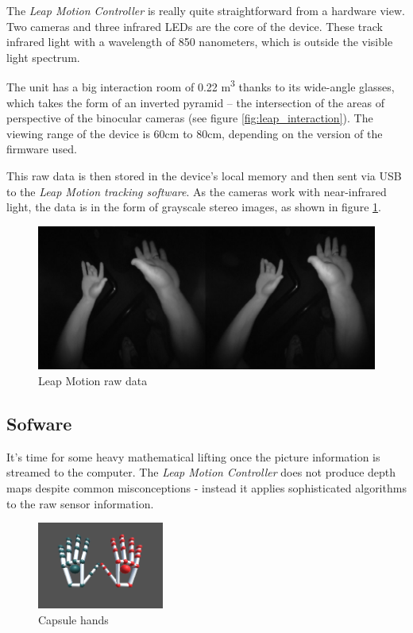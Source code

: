 \documentclass[12pt,a4paper,twoside]{report}
\begin{document}
The \textit{Leap Motion Controller} is really quite straightforward from a hardware view. Two cameras and three infrared LEDs are the core of the device. These track infrared light with a wavelength of 850 nanometers, which is outside the visible light spectrum. \cite{LeapArticle}

The unit has a big interaction room of 0.22 m\textsuperscript{3} thanks to its wide-angle glasses, which takes the form of an inverted pyramid – the intersection of the areas of perspective of the binocular cameras (see figure \ref{fig:leap_interaction}). The viewing range of the device is 60cm to 80cm, depending on the version of the firmware used.

This raw data is then stored in the device's local memory and then sent via USB to the \textit{Leap Motion tracking software}. As the cameras work with near-infrared light, the data is in the form of grayscale stereo images, as shown in figure \ref{fig:leap_raw}.


\begin{figure}[h]
  \centering
  \includegraphics[width=0.9\linewidth]{img/Leap_raw.jpg}
  \caption[]{Leap Motion raw data \footnotemark[2]}
  \label{fig:leap_raw}
\end{figure}

\subsection{Sofware}

It's time for some heavy mathematical lifting once the picture information is streamed to the computer. The \textit{Leap Motion Controller} does not produce depth maps despite common misconceptions - instead it applies sophisticated algorithms to the raw sensor information.

\begin{figure}
  \includegraphics[width=0.37\textwidth]{img/Leap_capsule_hands.png}
  \caption[]{Capsule hands \footnotemark}
  \label{fig:leap_capsule}
\end{figure}
\end{document}
